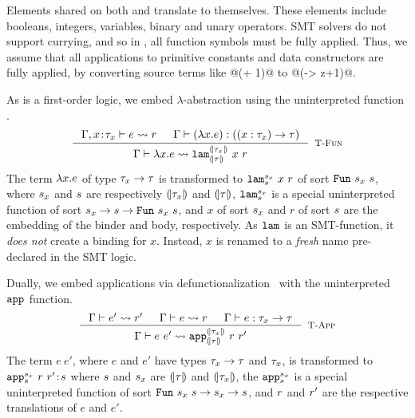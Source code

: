 %
Elements shared on both \corelan and \smtlan
translate to themselves.
%
These elements include
booleans,
integers,
variables,
binary
and unary
operators.
%
SMT solvers do not support currying,
and so in \smtlan, all function symbols
must be fully applied.
%
Thus, we assume that all applications
to primitive constants and data
constructors are fully applied, \eg by converting
source terms like @(+ 1)@ to
@(\z -> z+1)@.
%


%
As \smtlan is a first-order logic, we
embed $\lambda$-abstraction
using the uninterpreted function
\smtlamname{}{}.
%
$$
\inference{
    \tologicshort{\env, \tbind{x}{\typ_x}}{e}{}{\pred}{}{}{} &
        \hastype{\env}{(\efun{x}{}{e})}{(\tfun{x}{\typ_x}{\typ})}\\
}{
	\tologicshort{\env}{\efun{x}{}{e}}{(\tfun{x}{\typ_x}{\typ})}
	        {\smtlamname{\embed{\typ_x}}{\embed{\typ}}\ {x}\ {\pred}}
	        {\sort'}{\smtenv, \tbind{f}{\sort'}}{\andaxioms{\{\axioms_{f_1}, \axioms_{f_2}\}}{\axioms}}
}[\lgfun]
$$
%
The term $\lambda x. e$ of type
${\tau_x \rightarrow \tau}$ is transformed
to
${\smtlamname{\sort_x}{\sort}\ x\ \pred}$
of sort
${\mathtt{Fun}\ {s_x}\ {s}}$, where
%
$s_x$ and $s$ are respectively
$(\!|\tau_x|\!)$ and $(\!|\tau|\!)$,
%
${\texttt{lam}^{s_x}_{s}}$
is a special uninterpreted function
of sort
${s_x \rightarrow s\rightarrow\mathtt{Fun}\ {s_x}\ {s}}$,
and
$x$ of sort $s_x$ and $r$ of sort $s$ are
the embedding of the binder and body, respectively.
%
As $\texttt{lam}^{}_{}$ is an SMT-function,
it \emph{does not} create a binding for $x$.
%
Instead, $x$ is renamed to
a \emph{fresh} name pre-declared in
the SMT logic.


%
Dually, we embed applications via
defunctionalization~\citep{Reynolds72}
with the uninterpreted $\texttt{app}^{}_{}$ function.
%
$$
\inference{
	\tologicshort{\env}{e'}{\typ_x}{\pred'}{\embed{\typ_x}}{\smtenv}{\axioms'}
	&
	\tologicshort{\env}{e}{\tfun{x}{\typ_x}{\typ}}{\pred}{\tsmtfun{\embed{\typ_x}}{\embed{\typ}}}{\smtenv}{\axioms}
	&
	\hastype{\env}{e}{{\typ_x}\rightarrow{\typ}}
}{
	\tologicshort{\env}{e\ e'}{\typ}{\smtappname{\embed{\typ_x}}{\embed{\typ}}\ {\pred}\ {\pred'}}{\embed{\typ}}{\smtenv}{\andaxioms{\axioms}{\axioms'}}
}[\lgapp]
$$
%
The term ${e\ e'}$, where $e$ and $e'$ have
types ${\tau_x \rightarrow \tau}$ and $\tau_x$,
is transformed to
${\tbind{\smtappname{\sort_x}{\sort}\ \pred\ \pred'}{\sort}}$
where
%
$s$ and $s_x$ are $(\!|\tau|\!)$ and $(\!|\tau_x|\!)$,
the
${\texttt{app}^{s_x}_{s}}$
is a special uninterpreted function of sort
${\mathtt{Fun}\ {s_x}\ {s} \rightarrow s_x \rightarrow s}$,
and
$r$ and $r'$ are the respective translations of $e$ and $e'$.


